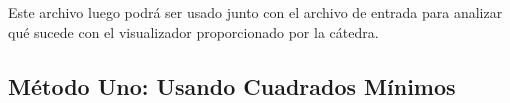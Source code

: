 Este archivo luego podrá ser usado junto con el archivo de entrada para analizar qué sucede con el visualizador proporcionado por la cátedra.


\subsection{Método Uno: Usando Cuadrados Mínimos}







